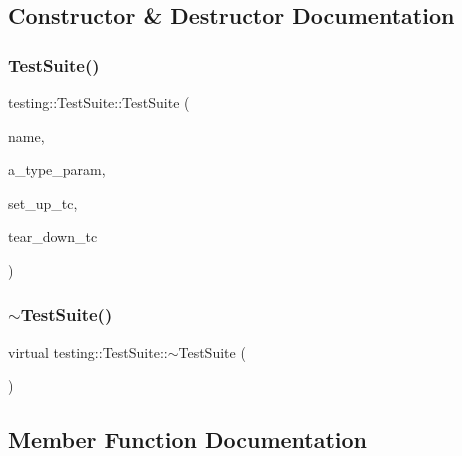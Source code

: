 \subsection{Constructor \& Destructor Documentation}
\mbox{\label{classtesting_1_1TestSuite_a2d6469bcb83701e1bbfe47c465e9731f}} 
\subsubsection{\texorpdfstring{Test\+Suite()}{TestSuite()}}
{\footnotesize\ttfamily testing\+::\+Test\+Suite\+::\+Test\+Suite (\begin{DoxyParamCaption}\item[{const char $\ast$}]{name,  }\item[{const char $\ast$}]{a\+\_\+type\+\_\+param,  }\item[{\hyperlink{namespacetesting_1_1internal_a83e4e0732ac6a9dcfe6ee299dc1b9fa2}{internal\+::\+Set\+Up\+Test\+Suite\+Func}}]{set\+\_\+up\+\_\+tc,  }\item[{\hyperlink{namespacetesting_1_1internal_a8257a87aa42cebaa54b0c48a6ae657a5}{internal\+::\+Tear\+Down\+Test\+Suite\+Func}}]{tear\+\_\+down\+\_\+tc }\end{DoxyParamCaption})}

\mbox{\label{classtesting_1_1TestSuite_a78af2d96b44c8b8f2002b4e74df31c38}} 
\subsubsection{\texorpdfstring{$\sim$\+Test\+Suite()}{~TestSuite()}}
{\footnotesize\ttfamily virtual testing\+::\+Test\+Suite\+::$\sim$\+Test\+Suite (\begin{DoxyParamCaption}{ }\end{DoxyParamCaption})\hspace{0.3cm}{\ttfamily [virtual]}}



\subsection{Member Function Documentation}
\mbox{\label{classtesting_1_1TestSuite_a3391a0ec111c66e1ac16a800f5068af7}} 
